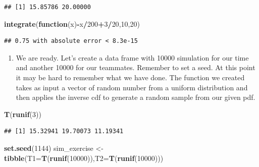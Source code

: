 \documentclass[
]{book}
\newenvironment{Shaded}{\begin{snugshade}}{\end{snugshade}}
\newcommand{\ControlFlowTok}[1]{\textcolor[rgb]{0.13,0.29,0.53}{\textbf{#1}}}
\newcommand{\DataTypeTok}[1]{\textcolor[rgb]{0.13,0.29,0.53}{#1}}
\newcommand{\DecValTok}[1]{\textcolor[rgb]{0.00,0.00,0.81}{#1}}
\newcommand{\KeywordTok}[1]{\textcolor[rgb]{0.13,0.29,0.53}{\textbf{#1}}}
\newcommand{\NormalTok}[1]{#1}
\newcommand{\OperatorTok}[1]{\textcolor[rgb]{0.81,0.36,0.00}{\textbf{#1}}}
\newcommand{\StringTok}[1]{\textcolor[rgb]{0.31,0.60,0.02}{#1}}
\providecommand{\tightlist}{%
  \setlength{\itemsep}{0pt}\setlength{\parskip}{0pt}}
\begin{document}
\begin{verbatim}
## [1] 15.85786 20.00000
\end{verbatim}

\begin{Shaded}
\begin{Highlighting}[]
\KeywordTok{integrate}\NormalTok{(}\ControlFlowTok{function}\NormalTok{(x)}\OperatorTok{-}\NormalTok{x}\OperatorTok{/}\DecValTok{200}\OperatorTok{+}\DecValTok{3}\OperatorTok{/}\DecValTok{20}\NormalTok{,}\DecValTok{10}\NormalTok{,}\DecValTok{20}\NormalTok{)}
\end{Highlighting}
\end{Shaded}

\begin{verbatim}
## 0.75 with absolute error < 8.3e-15
\end{verbatim}

\begin{enumerate}
\def\labelenumi{\alph{enumi}.}
\setcounter{enumi}{5}
\tightlist
\item
  We are ready. Let's create a data frame with 10000 simulation for our time and another 10000 for our teammates. Remember to set a seed. At this point it may be hard to remember what we have done. The function we created takes as input a vector of random number from a uniform distribution and then applies the inverse cdf to generate a random sample from our given pdf.
\end{enumerate}

\begin{Shaded}
\begin{Highlighting}[]
\KeywordTok{T}\NormalTok{(}\KeywordTok{runif}\NormalTok{(}\DecValTok{3}\NormalTok{))}
\end{Highlighting}
\end{Shaded}

\begin{verbatim}
## [1] 15.32941 19.70073 11.19341
\end{verbatim}

\begin{Shaded}
\begin{Highlighting}[]
\KeywordTok{set.seed}\NormalTok{(}\DecValTok{1144}\NormalTok{)}
\NormalTok{sim_exercise <-}\StringTok{ }\KeywordTok{tibble}\NormalTok{(}\DataTypeTok{T1=}\KeywordTok{T}\NormalTok{(}\KeywordTok{runif}\NormalTok{(}\DecValTok{10000}\NormalTok{)),}\DataTypeTok{T2=}\KeywordTok{T}\NormalTok{(}\KeywordTok{runif}\NormalTok{(}\DecValTok{10000}\NormalTok{)))}
\end{Highlighting}
\end{Shaded}
\end{document}
